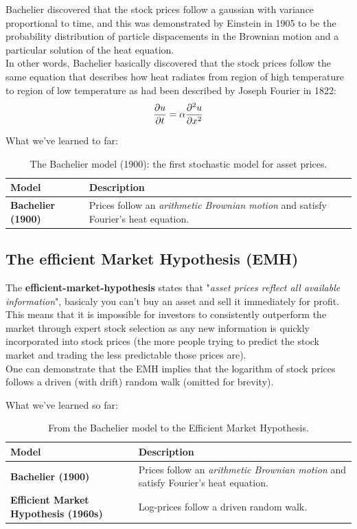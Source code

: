 Bachelier discovered that the stock prices follow a gaussian with variance proportional to time, and this was demonstrated by Einstein in 1905 to be the probability distribution of particle dispacements in the Brownian motion and a particular solution of the heat equation.\\
In other words, Bachelier basically discovered that the stock prices follow the same equation that describes how heat radiates from region of high temperature to region of low temperature as had been described by Joseph Fourier in 1822:
\begin{equation}\label{eq:heat}
    \pdv{u}{t} = \alpha \pdv[2]{u}{x}
\end{equation} 

What we've learned to far:

\begin{table}[H]
\centering
{}
\begin{tabular}{@{}p{4cm}p{8.5cm}@{}}
\toprule
\rowcolor{gray!15}
\textbf{Model} & \textbf{Description} \\ \midrule
\textbf{Bachelier (1900)} &
Prices follow an \emph{arithmetic Brownian motion} and satisfy Fourier's heat equation. \\
\bottomrule
\end{tabular}
\caption{The Bachelier model (1900): the first stochastic model for asset prices.}
\end{table}


\subsection{The efficient Market Hypothesis (EMH)}
The \textbf{efficient-market-hypothesis} states that "\textit{asset prices reflect all available information}", basicaly you can't buy an asset and sell it immediately for profit.\\
This means that it is impossible for investors to consistently outperform the market through expert stock selection as any new information is quickly incorporated into stock prices (the more people trying to predict the stock market and trading the less predictable those prices are).\\

 One can demonstrate that the EMH implies that the logarithm of stock prices follows a driven (with drift) random walk (omitted for brevity).

What we've learned so far:

\begin{table}[H]
\centering
{}
\begin{tabular}{@{}p{4cm}p{8.5cm}@{}}
\toprule
\rowcolor{gray!15}
\textbf{Model} & \textbf{Description} \\ \midrule
\textbf{Bachelier (1900)} &
Prices follow an \emph{arithmetic Brownian motion} and satisfy Fourier's heat equation. \\[3pt]
\textbf{Efficient Market Hypothesis (1960s)} &
Log-prices follow a driven random walk. \\ 
\bottomrule
\end{tabular}
\caption{From the Bachelier model to the Efficient Market Hypothesis.}
\end{table}

